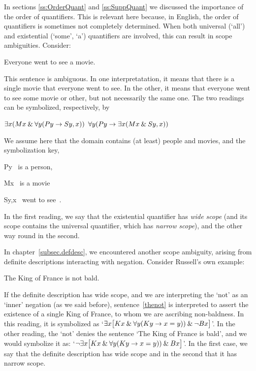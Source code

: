 In sections \ref{ss:OrderQuant} and \ref{ss:SuppQuant} we discussed the importance of the order of quantifiers.  This is relevant here because, in English, the order of quantifiers is sometimes not completely determined.  When both universal (`all') and existential (`some', `a') quantifiers are  involved, this can result in scope ambiguities. Consider:
\begin{earg}
	\item[\ex{everya}] Everyone went to see a movie.
\end{earg}
This sentence is ambiguous.  In one interpretatation, it means that there is a single movie that everyone went to see. In the  other, it means that everyone went to see some movie or other, but not necessarily the same one. The two readings can be symbolized, respectively, by
\begin{earg}
	\prem $\exists x({M}{x} \mathbin{\&} \forall y({P}{y} \rightarrow {S}{y,x}))$
	\prem $\forall y({P}{y} \rightarrow \exists x({M}{x} \mathbin{\&} {S}{y,x}))$
\end{earg}
We assume here that the domain contains (at least) people and movies, and the symbolization key,
\begin{ekey}
	\item[{P}{y}] ~is a person,
	\item[{M}{x}] ~is a movie
	\item[{S}{y,x}] ~went to see~.
\end{ekey}
In the first reading, we say that the existential quantifier has \emph{wide scope} (and its scope contains the universal quantifier, which has \emph{narrow scope}), and the other way round in the second.

In chapter~\ref{subsec.defdesc}, we encountered another scope ambiguity, arising from definite descriptions interacting with negation.  Consider Russell's own example:
\begin{earg}
	\item[\ex{thenot}] The King of France is not bald.
\end{earg}
If the definite description has wide scope, and we are interpreting the `not' as an `inner' negation (as we said before), sentence~\ref{thenot} is interpreted to assert the existence of a single King of France, to whom we are ascribing non-baldness. In this reading, it is symbolized as `$\exists x\bigl[{K}{x} \mathbin{\&} \forall y({K}{y} \rightarrow x=y)) \mathbin{\&} \neg {B}{x}\bigr]$'. In the other reading, the `not' denies the sentence `The King of France is bald', and we would symbolize it as: `$\neg\exists x\bigl[{K}{x} \mathbin{\&} \forall y({K}{y} \rightarrow x=y)) \mathbin{\&} {B}{x}\bigr]$'. In the first case, we say that the definite description has wide scope and in the second that it has narrow scope.

